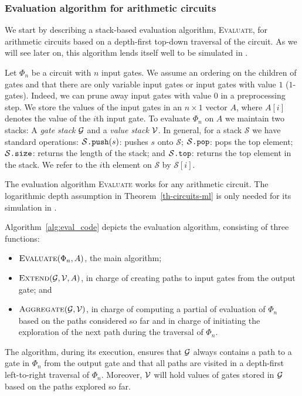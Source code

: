 \subsubsection{Evaluation algorithm for arithmetic circuits}\label{subsubsec:eval}
We start by describing a stack-based evaluation algorithm, \textsc{Evaluate}, for arithmetic circuits based on a depth-first top-down traversal of the circuit. As we will see later on, this algorithm lends itself well to be simulated in \langfor. 

Let $\Phi_n$ be a circuit with $n$ input gates. We assume an ordering on the children of gates and that there are only variable input gates or input gates with value $1$ ($1$-gates). Indeed, we can prune away input gates with value $0$ in a preprocessing step. We store the values of the input gates in an $n\times 1$ vector $A$, where $A[i]$ denotes the value
of the $i$th input gate. To evaluate $\Phi_n$ on $A$ we  maintain two stacks: A \textit{gate stack}
 $\mathcal{G}$ and a \textit{value stack} $\mathcal{V}$. In general, for a stack $\mathcal S$ we have standard operations: $\mathcal S\texttt{.push}(s)$: pushes $s$ onto $\mathcal S$;
$\mathcal S\texttt{.pop}$: pops the top element;  $\mathcal S\texttt{.size}$: returns the length of the stack; and
$\mathcal S\texttt{.top}$: returns the top element in the stack. We refer to the $i$th element on $\mathcal S$ by $\mathcal S[i]$.

\smallskip
The evaluation algorithm \textsc{Evaluate} works for any arithmetic circuit. The logarithmic depth assumption in Theorem~\ref{th-circuits-ml} is only needed for its simulation in \langfor.

Algorithm~\ref{alg:eval_code} depicts the evaluation algorithm, consisting of three functions:
\begin{itemize}
\item $\textsc{Evaluate}(\Phi_n,A)$, the main algorithm; 
\item $\textsc{Extend}(\mathcal{G},\mathcal{V},A)$, in charge of creating paths to input gates from the output gate; and 
\item $\textsc{Aggregate}(\mathcal{G},\mathcal{V})$, in charge of computing a partial of evaluation of $\Phi_n$ based on the paths considered so far and in charge of initiating the exploration of the next path during the traversal of $\Phi_n$.
\end{itemize}
The algorithm, during its execution, ensures that 
$\mathcal{G}$ always contains a path to a gate in $\Phi_n$ from the output gate and that all paths are visited in a depth-first left-to-right traversal of $\Phi_n$. Moreover, $\mathcal{V}$ will hold values of gates stored in $\mathcal{G}$ based on the paths explored so far.


